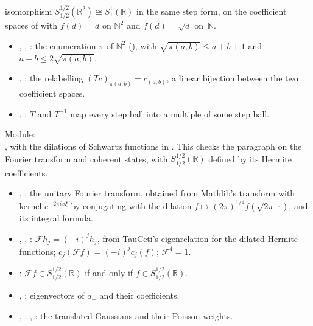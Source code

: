 \documentclass[11pt]{article}
\theoremstyle{definition}
\begin{document}
isomorphism $S^{1/2}_{1/2}(\mathbb R^2) \cong S^1_1(\mathbb R)$ in the same step form, on the
coefficient spaces of  with $f(d) = d$ on $\mathbb N^2$ and
$f(d) = \sqrt d$ on~$\mathbb N$.
\begin{itemize}
  \item {}, ,
    : the enumeration $\pi$ of $\mathbb N^2$
    (), with $\sqrt{\pi(a,b)} \le a + b + 1$ and
    $a + b \le 2\sqrt{\pi(a,b)}$.
  \item {}, : the
    relabelling $(Tc)_{\pi(a,b)} = c_{(a,b)}$, a linear bijection between the two coefficient
    spaces.
  \item {},
    : $T$ and $T^{-1}$ map every step ball
    into a multiple of some step ball.
\end{itemize}
Module:\\ , with the dilations
of Schwartz functions in . This
checks the paragraph on the Fourier transform and coherent states, with
$S^{1/2}_{1/2}(\mathbb R)$ defined by its Hermite coefficients.
\begin{itemize}
  \item {}, : the unitary Fourier transform, obtained from
    Mathlib's transform with kernel $e^{-2\pi ix\xi}$ by conjugating with the dilation
    $f \mapsto (2\pi)^{1/4}f(\sqrt{2\pi}\,\cdot)$, and its integral formula.
  \item {}, , :
    $\mathcal F h_j = (-i)^j h_j$, from TauCeti's eigenrelation for the dilated Hermite
    functions; $c_j(\mathcal F f) = (-i)^j c_j(f)$; $\mathcal F^4 = 1$.
  \item {}: $\mathcal F f \in S^{1/2}_{1/2}(\mathbb R)$ if
    and only if $f \in S^{1/2}_{1/2}(\mathbb R)$.
  \item {}, :
    eigenvectors of $a_-$ and their coefficients.
  \item {}, , ,
    : the translated Gaussians and their Poisson weights.
\end{itemize}
\end{document}
